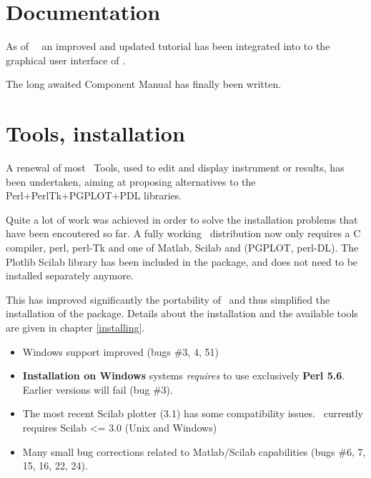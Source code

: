 \section{Documentation}
\label{s:new-features:documentation}

As of \MCS\ \version\ an improved and updated tutorial has been integrated
into to the graphical user interface of \MCS .

The long awaited Component Manual has finally been written.

\section{Tools, installation}
\label{s:new-features:tools}
  A renewal of most \MCS\ Tools, used to edit and display instrument or
  results,  has been undertaken, aiming at proposing alternatives to the
  Perl+PerlTk+PGPLOT+PDL  libraries.

  Quite a lot of work was achieved in order to solve the installation problems
   that have been encoutered so far. A fully working \MCS\ distribution now
   only requires a C compiler, perl, perl-Tk and one of Matlab, Scilab and
   (PGPLOT, perl-DL). The Plotlib Scilab library has  been included in the
   package, and does not need to be installed separately anymore.

  This has improved significantly the portability of \MCS\ and thus simplified
  the installation of the package. Details about the installation and the
  available tools are given in chapter \ref{installing}.

\begin{itemize}
\item Windows support improved (bugs \#3, 4, 51)
\item {\bf Installation on Windows} systems \emph{requires} to use exclusively {\bf Perl 5.6}. Earlier versions will fail (bug \#3).
\item The most recent Scilab plotter (3.1) has some compatibility issues. \MCS\ currently requires Scilab <= 3.0 (Unix and Windows)
\item Many small bug corrections related to Matlab/Scilab capabilities (bugs \#6, 7, 15, 16, 22, 24).
\end{itemize}

